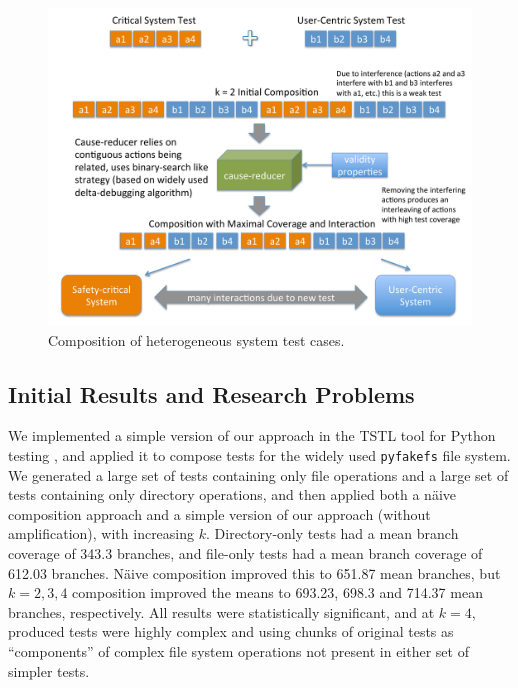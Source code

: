 \documentclass[12pt]{article}
\newcommand{\mycomment}[1]{}
\begin{document}
\begin{figure}
\centering
\includegraphics[width=0.6\columnwidth]{testcomp}
\caption{Composition of heterogeneous system test cases.}
\label{fig:compose}
\end{figure}


\mycomment{
To understand the concept, consider the simple case where {\tt A =
  a1.a2.a3.a4 and B = b1.b2.b3.b4}, with $k = 3$.  If {\tt a1}
interferes with {\tt B}, causing the catalog to fail with an invariant
violated at action {\tt b3}, then our approach can produce a test such
as: {\tt a2.a3.a4.b1.b2.b3.a1.}{\tt a2.a3.a4.b1.b2.b3.b4.a1.a2.a3. a4}. Here,
{\tt a1} is removed from the copy of {\tt A} before any {\tt b3}, but
remains in the final version, from which all {\tt B} actions are
removed, because it adds new code coverage of the low-level file
system.  One {\tt b4} instance is removed, because it causes the
low-level file system code to be in a state such that the second copy
of {\tt B} exercises less code (it forces an early garbage collection
of flash blocks).  Using gains in coverage to change the base test (a
variation of cause reduction we refer to as ``amplification''), we can direct
the reduction toward this high-coverage, valid, composed test without
human intervention.  }

\subsection{Initial Results and Research Problems}

We implemented a simple version of our approach in the TSTL tool for
Python testing \cite{NFM15}, and applied
it to compose tests for the widely used {\tt pyfakefs} file system.  We generated a
large set of tests containing only file operations and a large set of
tests containing only directory operations, and then applied both a
n\"aive composition approach and a simple version of our approach
(without amplification), with increasing $k$.  Directory-only tests
had a mean branch coverage of 343.3 branches, and file-only tests had
a mean branch coverage of 612.03 branches.  N\"aive composition
improved this to 651.87 mean branches, but $k=2, 3, 4$ composition improved
the means to 693.23, 698.3 and 714.37 mean branches, respectively.
All results were statistically significant, and at $k=4$, produced
tests were highly complex and using chunks of original tests as
``components'' of complex file system operations not present in either
set of simpler tests.
\end{document}
